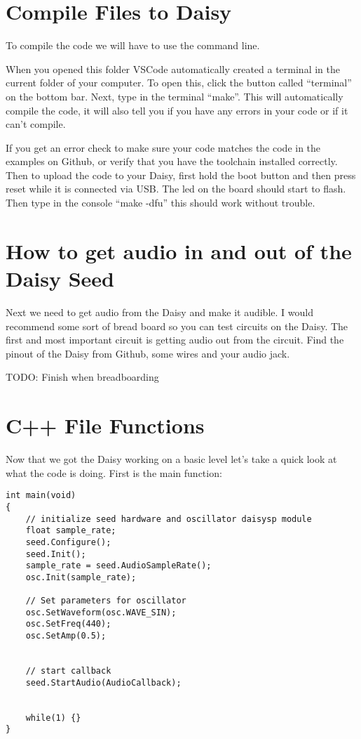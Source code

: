 \documentclass[12pt]{article}
\begin{document}
\section{Compile Files to Daisy}
To compile the code we will have to use the command line.

When you opened this folder VSCode automatically created a terminal in the current folder of your computer. To open this, click the button called “terminal” on the bottom bar. Next, type in the terminal “make”. This will automatically compile the code, it will also tell you if you have any errors in your code or if it can’t compile.

If you get an error check to make sure your code matches the code in the examples on Github, or verify that you have the toolchain installed correctly. Then to upload the code to your Daisy, first hold the boot button and then press reset while it is connected via USB. The led on the board should start to flash. Then type in the console “make -dfu” this should work without trouble.


\section{How to get audio in and out of the Daisy Seed}
Next we need to get audio from the Daisy and make it audible. I would recommend some sort of bread board so you can test circuits on the Daisy. The first and most important circuit is getting audio out from the circuit. Find the pinout of the Daisy from Github, some wires and your audio jack.

TODO: Finish when breadboarding

\section{C++ File Functions}
Now that we got the Daisy working on a basic level let's take a quick look at what the code is doing. First is the main function:

\begin{lstlisting}
int main(void)
{
    // initialize seed hardware and oscillator daisysp module
    float sample_rate;
    seed.Configure();
    seed.Init();
    sample_rate = seed.AudioSampleRate();
    osc.Init(sample_rate);

    // Set parameters for oscillator
    osc.SetWaveform(osc.WAVE_SIN);
    osc.SetFreq(440);
    osc.SetAmp(0.5);


    // start callback
    seed.StartAudio(AudioCallback);


    while(1) {}
}

\end{lstlisting}
\end{document}
